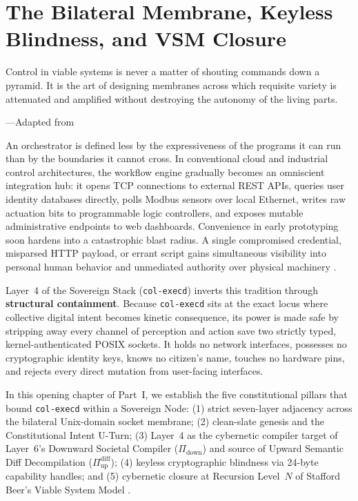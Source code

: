\chapter{The Bilateral Membrane, Keyless Blindness, and VSM Closure}
\label{ch:bilateral-membrane}

\epigraph{Control in viable systems is never a matter of shouting commands down a pyramid. It is the art of designing membranes across which requisite variety is attenuated and amplified without destroying the autonomy of the living parts.}{---Adapted from \textcite{beer1979}}

An orchestrator is defined less by the expressiveness of the programs it can run than by the
boundaries it cannot cross. In conventional cloud and industrial control architectures, the
workflow engine gradually becomes an omniscient integration hub: it opens TCP connections to
external REST APIs, queries user identity databases directly, polls Modbus sensors over
local Ethernet, writes raw actuation bits to programmable logic controllers, and exposes
mutable administrative endpoints to web dashboards. Convenience in early prototyping soon
hardens into a catastrophic blast radius. A single compromised credential, misparsed HTTP
payload, or errant script gains simultaneous visibility into personal human behavior and
unmediated authority over physical machinery \parencite{rose2020zero,saltzer1984end}.

Layer~4 of the Sovereign Stack (\texttt{col-execd}) inverts this tradition through
\textbf{structural containment}. Because \texttt{col-execd} sits at the exact locus where
collective digital intent becomes kinetic consequence, its power is made safe by stripping
away every channel of perception and action save two strictly typed, kernel-authenticated
POSIX sockets. It holds no network interfaces, possesses no cryptographic identity keys,
knows no citizen's name, touches no hardware pins, and rejects every direct mutation from
user-facing interfaces.

In this opening chapter of Part~I, we establish the five constitutional pillars that bound
\texttt{col-execd} within a Sovereign Node: (1) strict seven-layer adjacency across the
bilateral Unix-domain socket membrane; (2) clean-slate genesis and the Constitutional Intent
U-Turn; (3) Layer~4 as the cybernetic compiler target of Layer~6's Downward Societal Compiler
($\Pi_{\mathrm{down}}$) and source of Upward Semantic Diff Decompilation
($\Pi_{\mathrm{up}}^{\mathrm{diff}}$); (4) keyless cryptographic blindness via 24-byte
capability handles; and (5) cybernetic closure at Recursion Level~$N$ of Stafford Beer's
Viable System Model \parencite{beer1972,beer1979}.

